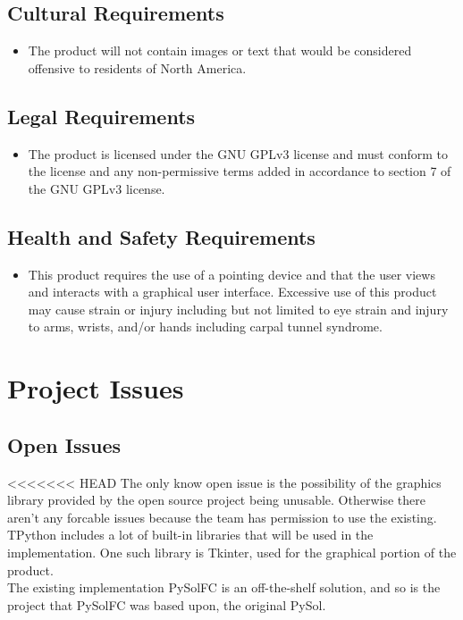 \documentclass{article}
\begin{document}
		\subsection{Cultural Requirements}
		\begin{itemize}
			\itemsep0em
			\item The product will not contain images or text that would be 
			considered offensive to residents of North America.
		\end{itemize}
		\subsection{Legal Requirements}
		\begin{itemize}
			\itemsep0em
			\item The product is licensed under the GNU GPLv3 license and must 
			conform to the license and any non-permissive terms added in 
			accordance to section 7 of the GNU GPLv3 license.
		\end{itemize}
		\subsection{Health and Safety Requirements}
		\begin{itemize}
			\itemsep0em
			\item This product requires the use of a pointing device and that the user
			views and interacts with a graphical user interface. Excessive use of this
			product may cause strain or injury including but not limited to eye strain
			and injury to arms, wrists, and/or hands including carpal tunnel syndrome.
		\end{itemize}
		
	\section{Project Issues}
		\subsection{Open Issues}
<<<<<<< HEAD
		\indent \indent The only know open issue is the possibility of the graphics library provided by the open source project being unusable. Otherwise there aren't any forcable issues because the team has permission to use the existing.\\
		\indent TPython includes a lot of built-in libraries that will be used in the implementation. One such library is Tkinter, used for the graphical portion of the product.\\
		\indent The existing implementation PySolFC is an off-the-shelf solution, and so is the project that PySolFC was based upon, the original PySol.\\
\end{document}
